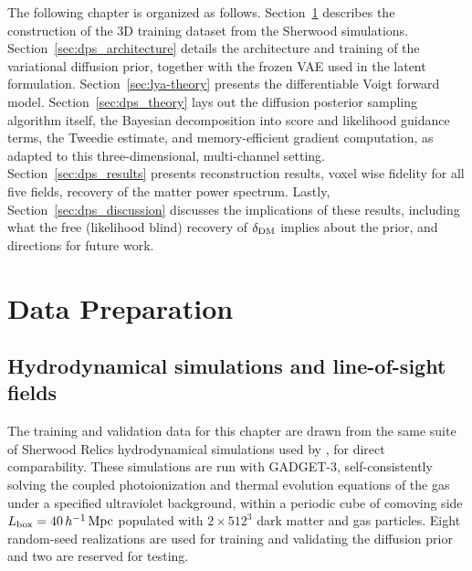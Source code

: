 The following chapter is organized as follows. Section~\ref{sec:lya-data-prep} describes the construction of the 3D training dataset from the Sherwood simulations. Section~\ref{sec:dps_architecture} details the architecture and training of the variational diffusion prior, together with the frozen VAE used in the latent formulation. Section~\ref{sec:lya-theory} presents the differentiable Voigt forward model. Section~\ref{sec:dps_theory} lays out the diffusion posterior sampling algorithm itself, the Bayesian decomposition into score and likelihood guidance terms, the Tweedie estimate, and memory-efficient gradient computation, as adapted to this three-dimensional, multi-channel setting. Section~\ref{sec:dps_results} presents reconstruction results, voxel wise fidelity for all five fields, recovery of the matter power spectrum. Lastly, Section~\ref{sec:dps_discussion} discusses the implications of these results, including what the free (likelihood blind) recovery of $\delta_{\rm DM}$ implies about the prior, and directions for future work.

\section{Data Preparation}
\label{sec:lya-data-prep}


\subsection{Hydrodynamical simulations and line-of-sight fields}
\label{sec:lya-sims}

The training and validation data for this chapter are drawn from the same suite of Sherwood Relics hydrodynamical simulations \citep{bolton_sherwood_2017,puchwein_sherwood-relics_2023} used by \citet{Maitra_2026}, for direct comparability. These simulations are run with GADGET-3, self-consistently solving the coupled photoionization and thermal evolution equations of the gas under a specified ultraviolet background, within a periodic cube of comoving side $L_{\rm box}=40\,h^{-1}\,\mathrm{Mpc}$ populated with $2\times512^3$ dark matter and gas particles. Eight random-seed realizations are used for training and validating the diffusion prior and two are reserved for testing.

